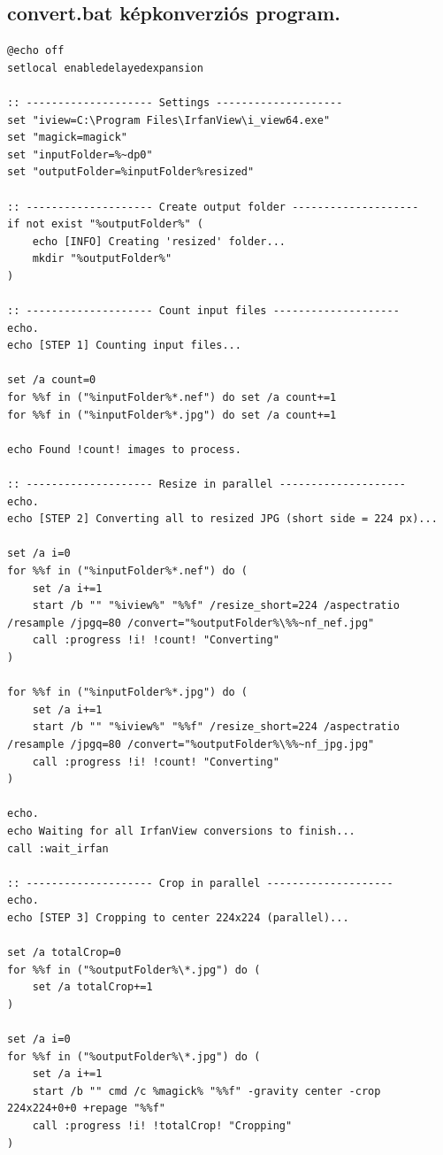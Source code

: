 \documentclass[	
  noindent
]{elteikthesis}[2024/04/26]
\begin{document}
    \subsection{convert.bat képkonverziós program.}
    \begin{lstlisting}[language={[x86masm]Assembler}]
@echo off
setlocal enabledelayedexpansion

:: -------------------- Settings --------------------
set "iview=C:\Program Files\IrfanView\i_view64.exe"
set "magick=magick"
set "inputFolder=%~dp0"
set "outputFolder=%inputFolder%resized"

:: -------------------- Create output folder --------------------
if not exist "%outputFolder%" (
    echo [INFO] Creating 'resized' folder...
    mkdir "%outputFolder%"
)

:: -------------------- Count input files --------------------
echo.
echo [STEP 1] Counting input files...

set /a count=0
for %%f in ("%inputFolder%*.nef") do set /a count+=1
for %%f in ("%inputFolder%*.jpg") do set /a count+=1

echo Found !count! images to process.

:: -------------------- Resize in parallel --------------------
echo.
echo [STEP 2] Converting all to resized JPG (short side = 224 px)...

set /a i=0
for %%f in ("%inputFolder%*.nef") do (
    set /a i+=1
    start /b "" "%iview%" "%%f" /resize_short=224 /aspectratio /resample /jpgq=80 /convert="%outputFolder%\%%~nf_nef.jpg"
    call :progress !i! !count! "Converting"
)

for %%f in ("%inputFolder%*.jpg") do (
    set /a i+=1
    start /b "" "%iview%" "%%f" /resize_short=224 /aspectratio /resample /jpgq=80 /convert="%outputFolder%\%%~nf_jpg.jpg"
    call :progress !i! !count! "Converting"
)

echo.
echo Waiting for all IrfanView conversions to finish...
call :wait_irfan

:: -------------------- Crop in parallel --------------------
echo.
echo [STEP 3] Cropping to center 224x224 (parallel)...

set /a totalCrop=0
for %%f in ("%outputFolder%\*.jpg") do (
    set /a totalCrop+=1
)

set /a i=0
for %%f in ("%outputFolder%\*.jpg") do (
    set /a i+=1
    start /b "" cmd /c %magick% "%%f" -gravity center -crop 224x224+0+0 +repage "%%f"
    call :progress !i! !totalCrop! "Cropping"
)


\end{lstlisting}
\end{document}
